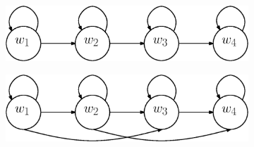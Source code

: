 \documentclass[a4paper, oneside]{csthesis}
\begin{document}
\begin{figure}
        \centering
        \begin{subfigure}[b]{0.35\textwidth}
                \centering
                \includegraphics[width=\textwidth]{figures/hmm-ltr1.eps}
                \label{fig:hmm1}
        \end{subfigure}%
        \quad
        \begin{subfigure}[b]{0.35\textwidth}
                \centering
                \includegraphics[width=\textwidth]{figures/hmm-ltr2.eps}
                \label{fig:hmm1}
        \end{subfigure}%


\end{figure}
\end{document}
